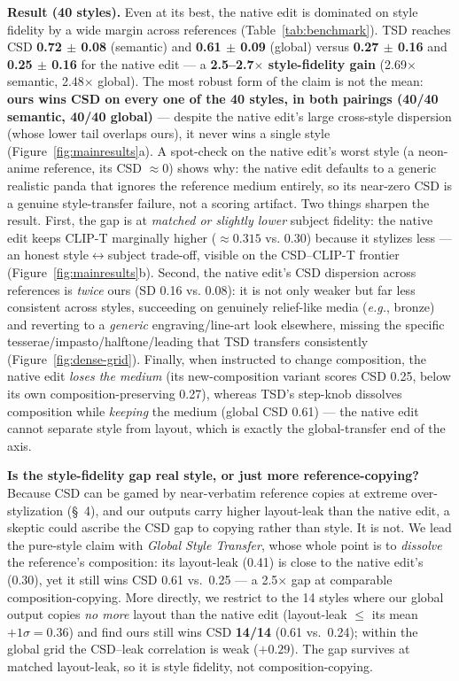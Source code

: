 \documentclass[letterpaper]{article} %
\newcommand{\eg}{\emph{e.g.}}
\begin{document}
\textbf{Result (40 styles).} Even at its best, the native edit is dominated
on style fidelity by a wide margin across references (Table~\ref{tab:benchmark}). TSD
reaches CSD \textbf{0.72 $\pm$ 0.08} (semantic) and \textbf{0.61 $\pm$ 0.09}
(global) versus \textbf{0.27 $\pm$ 0.16} and \textbf{0.25 $\pm$ 0.16} for the
native edit --- a \textbf{2.5--2.7$\times$ style-fidelity gain} (2.69$\times$
semantic, 2.48$\times$ global). The most robust form of the claim is not the
mean: \textbf{ours wins CSD on every one of the 40 styles, in both pairings
(40/40 semantic, 40/40 global)} --- despite the native edit's large cross-style
dispersion (whose lower tail overlaps ours), it never wins a single style
(Figure~\ref{fig:mainresults}a). A
spot-check on the native edit's worst style (a neon-anime reference, its CSD
$\approx 0$) shows why: the native edit defaults to a generic realistic
panda that ignores the reference medium entirely, so its near-zero CSD is a
genuine style-transfer failure, not a scoring artifact. Two things sharpen
the result. First, the gap is at \emph{matched or slightly lower} subject
fidelity: the native edit keeps CLIP-T marginally higher ($\approx 0.315$ vs.
0.30) because it stylizes less --- an honest style$\leftrightarrow$subject
trade-off, visible on the CSD--CLIP-T frontier (Figure~\ref{fig:mainresults}b).
Second, the native edit's CSD dispersion across references is \emph{twice}
ours (SD 0.16 vs. 0.08): it is not only weaker but far less consistent across
styles, succeeding on genuinely
relief-like media (\eg, bronze) and reverting to a \emph{generic}
engraving/line-art look elsewhere, missing the specific
tesserae/impasto/halftone/leading that TSD transfers consistently
(Figure~\ref{fig:dense-grid}). Finally,
when instructed to change composition, the native edit \emph{loses the
medium} (its new-composition variant scores CSD 0.25, below its own
composition-preserving 0.27), whereas TSD's step-knob dissolves composition
while \emph{keeping} the medium (global CSD 0.61) --- the native edit cannot
separate style from layout, which is exactly the global-transfer end of the
axis.

\textbf{Is the style-fidelity gap real style, or just more
reference-copying?} Because CSD can be gamed by near-verbatim reference copies
at extreme over-stylization (\S~4), and our outputs carry higher layout-leak
than the native edit, a skeptic could ascribe the CSD gap to copying rather
than style. It is not. We lead the pure-style claim with \emph{Global Style
Transfer}, whose whole point is to \emph{dissolve} the reference's
composition: its layout-leak (0.41) is close to the native edit's (0.30), yet
it still wins CSD 0.61 vs.\ 0.25 --- a 2.5$\times$ gap at comparable
composition-copying. More directly, we restrict to the 14 styles where our
global output copies \emph{no more} layout than the native edit (layout-leak
$\le$ its mean$+1\sigma = 0.36$) and find ours still wins CSD \textbf{14/14}
(0.61 vs.\ 0.24); within the global grid the CSD--leak correlation is weak
($+0.29$). The gap survives at matched layout-leak, so it is style fidelity,
not composition-copying.
\end{document}
